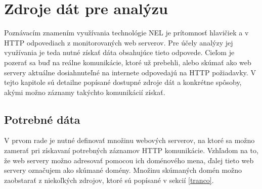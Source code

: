 \chapter{Zdroje dát pre analýzu}
\label{data-sources-available-for-research}


Poznávacím znamením využívania technológie NEL je prítomnosť hlavičiek  a  v HTTP odpovediach z monitorovaných web serverov. 
Pre účely analýzy jej využívania je teda nutné získať dáta obsahujúce tieto odpovede.
Cieľom je pozerať sa buď na reálne komunikácie, ktoré už prebehli, alebo skúmať ako web servery aktuálne dosiahnuteľné na internete
odpovedajú na HTTP požiadavky. 
V tejto kapitole sú detailne popísané dostupné zdroje dát a konkrétne spôsoby, akými možno záznamy takýchto komunikácií získať.

\section{Potrebné dáta}

V prvom rade je nutné definovať množinu webových serverov, na ktoré sa možno zamerať pri získavaní potrebných záznamov HTTP komunikácie.
Vzhľadom na to, že web servery možno adresovať pomocou ich doménového mena, ďalej tieto web servery označujem ako skúmané domény.
Množinu skúmaných domén možno zaobstarať z niekoľkých zdrojov, ktoré sú popísané v sekcií \ref{tranco}.

